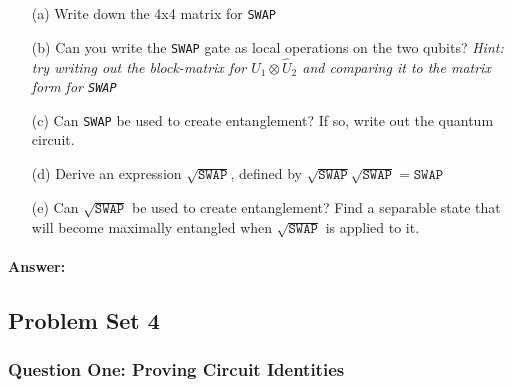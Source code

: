 \documentclass[reprint, amsmath,amssymb, aps]{revtex4-2}
\begin{document}
                    \begin{itemize}
                        \item[(a)] Write down the 4x4 matrix for \texttt{SWAP}
                        \item[(b)] Can you write the \texttt{SWAP} gate as local operations on the two qubits? \textit{Hint: try writing out the block-matrix for $\hat{U}_1\otimes\hat{U}_2$ and comparing it to the matrix form for \texttt{SWAP}}
                        \item[(c)] Can \texttt{SWAP} be used to create entanglement? If so, write out the quantum circuit.
                        \item[(d)] Derive an expression $\sqrt{\texttt{SWAP}}$, defined by $\sqrt{\texttt{SWAP}}\sqrt{\texttt{SWAP}} = \texttt{SWAP}$
                        \item[(e)] Can $\sqrt{\texttt{SWAP}}$ be used to create entanglement? Find a separable state that will become maximally entangled when $\sqrt{\texttt{SWAP}}$ is applied to it.
                    \end{itemize}

                \begin{mdframed}
                    \paragraph{Answer:}

                    
                \end{mdframed}

        \subsection{Problem Set 4}
            \subsubsection{Question One: Proving Circuit Identities}
\end{document}
